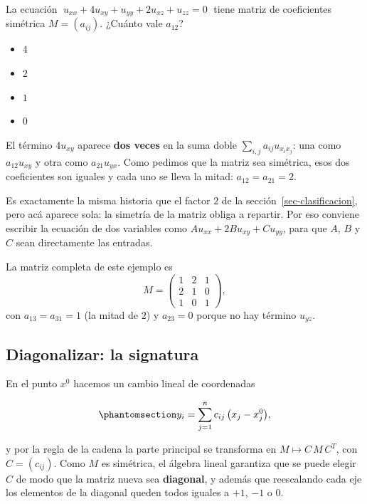 \documentclass[
  spanish,
  a4paper,
]{scrbook}
\providecommand{\tightlist}{%
  \setlength{\itemsep}{0pt}\setlength{\parskip}{0pt}}
\theoremstyle{definition}
\theoremstyle{plain}
\theoremstyle{definition}
\theoremstyle{plain}
\theoremstyle{definition}
\theoremstyle{remark}
\begin{document}
La ecuación \(\;u_{xx} + 4u_{xy} + u_{yy} + 2u_{xz} + u_{zz} = 0\;\)
tiene matriz de coeficientes simétrica \(M=(a_{ij})\). ¿Cuánto vale
\(a_{12}\)?

\begin{itemize}
\tightlist
\item
  {\(4\)}
\item
  {\(2\)}
\item
  {\(1\)}
\item
  {\(0\)}
\end{itemize}

El término \(4u_{xy}\) aparece \textbf{dos veces} en la suma doble
\(\sum_{i,j}a_{ij}u_{x_ix_j}\): una como \(a_{12}u_{xy}\) y otra como
\(a_{21}u_{yx}\). Como pedimos que la matriz sea simétrica, esos dos
coeficientes son iguales y cada uno se lleva la mitad:
\(a_{12}=a_{21}=2\).

Es exactamente la misma historia que el factor \(2\) de la
sección~\ref{sec-clasificacion}, pero acá aparece sola: la simetría de
la matriz obliga a repartir. Por eso conviene escribir la ecuación de
dos variables como \(A u_{xx} + 2B u_{xy} + C u_{yy}\), para que \(A\),
\(B\) y \(C\) sean directamente las entradas.

La matriz completa de este ejemplo es
\[M = \begin{pmatrix} 1 & 2 & 1 \\ 2 & 1 & 0 \\ 1 & 0 & 1\end{pmatrix},\]
con \(a_{13}=a_{31}=1\) (la mitad de \(2\)) y \(a_{23}=0\) porque no hay
término \(u_{yz}\).

\subsection{Diagonalizar: la signatura}\label{sec-signatura}

En el punto \(x^0\) hacemos un cambio lineal de coordenadas

\begin{equation}\protect\phantomsection\label{eq-cambio-lineal}{
y_i = \sum_{j=1}^{n} c_{ij}\,\big(x_j - x_j^0\big) ,
}\end{equation}

y por la regla de la cadena la parte principal se transforma en
\(M \mapsto C\,M\,C^{T}\), con \(C=(c_{ij})\). Como \(M\) es simétrica,
el álgebra lineal garantiza que se puede elegir \(C\) de modo que la
matriz nueva sea \textbf{diagonal}, y además que reescalando cada eje
los elementos de la diagonal queden todos iguales a \(+1\), \(-1\) o
\(0\).
\end{document}
